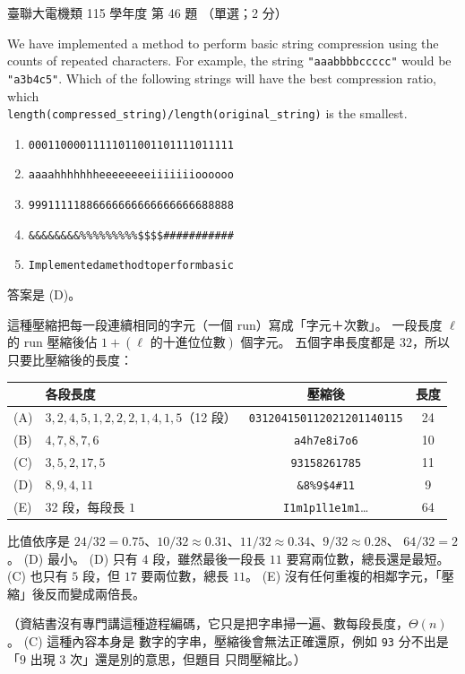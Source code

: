 \begin{pastexam}[label={px:ust-115-ee-ds-46}]{臺聯大電機類 115 學年度 第 46 題}
（單選；2 分）

We have implemented a method to perform basic string compression using the counts of repeated
characters. For example, the string \texttt{"aaabbbbccccc"} would be \texttt{"a3b4c5"}. Which of the
following strings will have the best compression ratio, which\\
\texttt{length(compressed\_string)/length(original\_string)} is the smallest.
\begin{enumerate}[label=(\Alph*)]
\item \texttt{00011000011111011001101111011111}
\item \texttt{aaaahhhhhhheeeeeeeeiiiiiiioooooo}
\item \texttt{99911111886666666666666666688888}
\item \texttt{\&\&\&\&\&\&\&\&\%\%\%\%\%\%\%\%\%\$\$\$\$\#\#\#\#\#\#\#\#\#\#\#}
\item \texttt{Implementedamethodtoperformbasic}
\end{enumerate}
\end{pastexam}

\begin{pastsoln}
答案是 (D)。

這種壓縮把每一段連續相同的字元（一個 run）寫成「字元＋次數」。 一段長度 $\ell$ 的 run 壓縮後佔
$1 + (\ell \text{ 的十進位位數})$ 個字元。 五個字串長度都是 $32$，所以只要比壓縮後的長度：
\begin{center}
\begin{tabular}{llcc}
\toprule
 & 各段長度 & 壓縮後 & 長度 \\
\midrule
(A) & $3, 2, 4, 5, 1, 2, 2, 2, 1, 4, 1, 5$（12 段） & \texttt{031204150112021201140115} & 24 \\
(B) & $4, 7, 8, 7, 6$ & \texttt{a4h7e8i7o6} & 10 \\
(C) & $3, 5, 2, 17, 5$ & \texttt{93158261785} & 11 \\
(D) & $8, 9, 4, 11$ & \texttt{\&8\%9\$4\#11} & 9 \\
(E) & 32 段，每段長 $1$ & \texttt{I1m1p1l1e1m1}\ldots & 64 \\
\bottomrule
\end{tabular}
\end{center}
比值依序是 $24/32 = 0.75$、$10/32 \approx 0.31$、$11/32 \approx 0.34$、$9/32 \approx 0.28$、
$64/32 = 2$。 (D) 最小。 (D) 只有 $4$ 段，雖然最後一段長 $11$ 要寫兩位數，總長還是最短。 (C) 也只有
$5$ 段，但 $17$ 要兩位數，總長 $11$。 (E) 沒有任何重複的相鄰字元，「壓縮」後反而變成兩倍長。

（資結書沒有專門講這種遊程編碼，它只是把字串掃一遍、數每段長度，$\Theta(n)$。 (C) 這種內容本身是
數字的字串，壓縮後會無法正確還原，例如 \texttt{93} 分不出是「$9$ 出現 $3$ 次」還是別的意思，但題目
只問壓縮比。）
\end{pastsoln}
